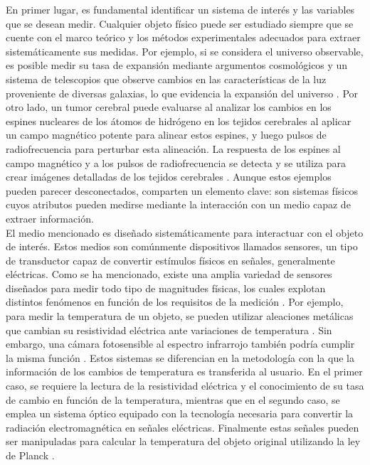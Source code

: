 \documentclass[]{book}
\begin{document}
\noindent En primer lugar, es fundamental identificar un sistema de interés y las variables que se desean medir. Cualquier objeto físico puede ser estudiado siempre que se cuente con el marco teórico y los métodos experimentales adecuados para extraer sistemáticamente sus medidas. Por ejemplo, si se considera el universo observable, es posible medir su tasa de expansión mediante argumentos cosmológicos y un sistema de telescopios que observe cambios en las características de la luz proveniente de diversas galaxias, lo que evidencia la expansión del universo \cite{weinberg1976first}. Por otro lado, un tumor cerebral puede evaluarse al analizar los cambios en los espines nucleares de los átomos de hidrógeno en los tejidos cerebrales al aplicar un campo magnético potente para alinear estos espines, y luego pulsos de radiofrecuencia para perturbar esta alineación. La respuesta de los espines al campo magnético y a los pulsos de radiofrecuencia se detecta y se utiliza para crear imágenes detalladas de los tejidos cerebrales \cite{ernst1990principles}. Aunque estos ejemplos pueden parecer desconectados, comparten un elemento clave: son sistemas físicos cuyos atributos pueden medirse mediante la interacción con un medio capaz de extraer información. \\

\noindent El medio mencionado es diseñado sistemáticamente para interactuar con el objeto de interés. Estos medios son comúnmente dispositivos llamados sensores, un tipo de transductor capaz de convertir estímulos físicos en señales, generalmente eléctricas. Como se ha mencionado, existe una amplia variedad de sensores diseñados para medir todo tipo de magnitudes físicas, los cuales explotan distintos fenómenos en función de los requisitos de la medición \cite{webster2018measurement}. Por ejemplo, para medir la temperatura de un objeto, se pueden utilizar aleaciones metálicas que cambian su resistividad eléctrica ante variaciones de temperatura \cite{scarr1960thermistors}. Sin embargo, una cámara fotosensible al espectro infrarrojo también podría cumplir la misma función \cite{driggers2012introduction}. Estos sistemas se diferencian en la metodología con la que la información de los cambios de temperatura es transferida al usuario. En el primer caso, se requiere la lectura de la resistividad eléctrica y el conocimiento de su tasa de cambio en función de la temperatura, mientras que en el segundo caso, se emplea un sistema óptico equipado con la tecnología necesaria para convertir la radiación electromagnética en señales eléctricas. Finalmente estas señales pueden ser manipuladas para calcular la temperatura del objeto original utilizando la ley de Planck \cite{krane2019modern}.\\
\end{document}
